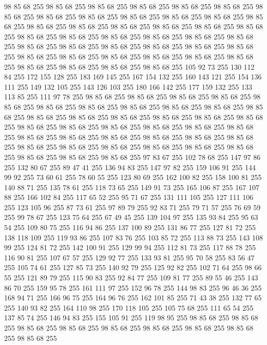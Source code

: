 98 85 68 255 98 85 68 255 98 85 68 255 98 85 68 255 98 85 68 255 98 85 68 255 98 85 68 255 98 85 68 255 98 85 68 255 98 85 68 255 98 85 68 255 98 85 68 255 98 85 68 255 98 85 68 255 98 85 68 255 98 85 68 255 98 85 68 255 98 85 68 255 98 85 68 255 98 85 68 255 98 85 68 255 98 85 68 255 98 85 68 255 98 85 68 255 98 85 68 255 98 85 68 255 98 85 68 255 98 85 68 255 98 85 68 255 98 85 68 255 98 85 68 255 98 85 68 255 98 85 68 255 98 85 68 255 98 85 68 255 98 85 68 255 98 85 68 255 98 85 68 255 98 85 68 255 98 85 68 255 98 85 68 255 105 92 73 255 130 112 84 255 172 155 128 255 183 169 145 255 167 154 132 255 160 143 121 255 154 136 111 255 149 132 105 255 143 126 103 255 180 166 142 255 177 159 132 255 133 113 85 255 111 97 78 255 98 85 68 255 98 85 68 255 98 85 68 255 98 85 68 255 98 85 68 255 98 85 68 255 98 85 68 255 98 85 68 255 98 85 68 255 98 85 68 255
98 85 68 255 98 85 68 255 98 85 68 255 98 85 68 255 98 85 68 255 98 85 68 255 98 85 68 255 98 85 68 255 98 85 68 255 98 85 68 255 98 85 68 255 98 85 68 255 98 85 68 255 98 85 68 255 98 85 68 255 98 85 68 255 98 85 68 255 98 85 68 255 98 85 68 255 98 85 68 255 98 85 68 255 98 85 68 255 98 85 68 255 98 85 68 255 98 85 68 255 98 85 68 255 98 85 68 255 98 85 68 255 97 83 67 255 102 78 68 255 147 97 86 255 132 80 67 255 89 47 41 255 136 94 83 255 147 97 82 255 159 106 91 255 144 99 92 255 73 60 61 255 78 60 55 255 123 80 69 255 162 100 82 255 158 100 81 255 140 88 71 255 135 78 61 255 118 73 65 255 149 91 73 255 165 106 87 255 167 107 88 255 166 102 84 255 117 65 52 255 95 71 67 255 131 111 105 255 127 111 106 255 123 105 96 255 87 73 61 255 97 89 79 255 92 83 71 255 79 71 57 255 76 69 59 255 99 78 67 255 123 75 64 255 67 49 45 255 139 104 97 255 135 93 84 255
95 63 54 255 109 80 75 255 116 94 86 255 137 100 89 255 131 86 77 255 127 81 72 255 138 118 109 255 119 93 86 255 107 83 76 255 103 85 72 255 113 88 73 255 143 108 99 255 124 81 72 255 142 100 91 255 129 99 94 255 112 81 73 255 117 88 78 255 116 90 81 255 107 67 57 255 129 92 77 255 133 93 81 255 95 70 58 255 83 56 47 255 105 74 61 255 127 85 73 255 140 92 79 255 125 92 82 255 102 71 64 255 98 66 55 255 121 89 79 255 115 90 83 255 92 84 77 255 109 81 77 255 89 55 46 255 143 86 70 255 159 95 78 255 161 111 97 255 152 96 78 255 144 98 83 255 96 46 36 255 168 94 71 255 166 96 75 255 164 96 76 255 162 101 85 255 71 43 38 255 132 77 65 255 140 93 82 255 164 110 98 255 170 118 105 255 105 75 68 255 111 65 54 255 137 85 74 255 146 94 83 255 155 105 91 255 119 98 95 255 98 85 68 255 98 85 68 255 98 85 68 255 98 85 68 255 98 85 68 255 98 85 68 255 98 85 68 255 98 85 68 255 98 85 68 255
